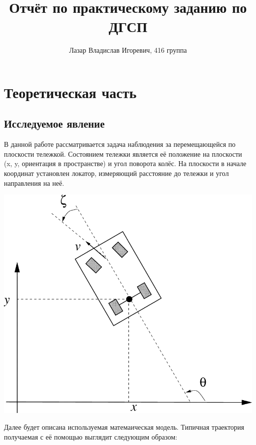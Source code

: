 \documentclass[12pt]{article}
\author{Лазар Владислав Игоревич, 416 группа}
\title{Отчёт по практическому заданию по ДГСП}
\begin{document}
\maketitle

\newpage

\tableofcontents

\newpage

\section{Теоретическая часть}

\subsection{Исследуемое явление}

В данной работе рассматривается задача наблюдения за перемещающейся по плоскости тележкой. Состоянием тележки является её положение на плоскости (x, y, ориентация в пространстве) и угол поворота колёс. На плоскости в начале координат установлен локатор, измеряющий расстояние до тележки и угол направления на неё.
\newline

\includegraphics[width=1.0\linewidth]{../system.png}

\newpage

Далее будет описана используемая матемаическая модель. Типичная траектория получаемая с её помощью выглядит следующим образом:
\end{document}
